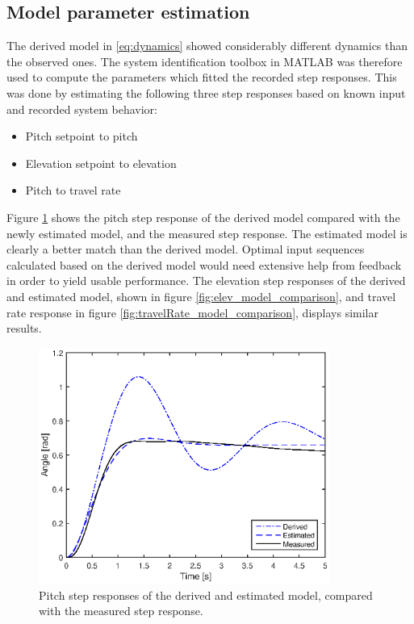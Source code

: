 \subsection{Model parameter estimation}
The derived model in \eqref{eq:dynamics} showed considerably different dynamics than the observed ones. The system identification toolbox in MATLAB was therefore used to compute the parameters which fitted the recorded step responses. This was done by estimating the following three step responses based on known input and recorded system behavior:

\begin{itemize}
	\item{Pitch setpoint to pitch}
	\item{Elevation setpoint to elevation}
	\item{Pitch to travel rate}
\end{itemize}

Figure \ref{fig:pitch_model_comparison} shows the pitch step response of the derived model compared with the newly estimated model, and the measured step response. The estimated model is clearly a better match than the derived model. Optimal input sequences calculated based on the derived model would need extensive help from feedback in order to yield usable performance. The elevation step responses of the derived and estimated model, shown in figure \ref{fig:elev_model_comparison}, and travel rate response in figure \ref{fig:travelRate_model_comparison}, displays similar results.

\begin{figure}[hp]
	\centering
		\includegraphics[width=0.85\textwidth]{figures/1/pitch_model_comparison.eps}
	\caption{Pitch step responses of the derived and estimated model, compared with the measured step response.}
	\label{fig:pitch_model_comparison}
\end{figure}

